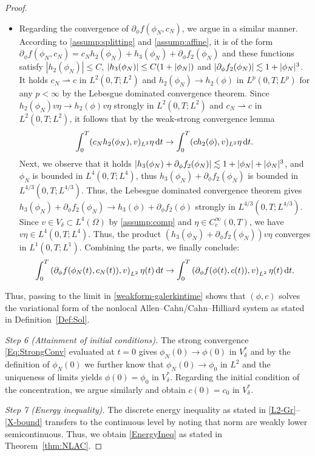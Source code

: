 \documentclass[]{article}
\newcommand{\dt}{\,\textup{d}t}
\DeclarePairedDelimiter{\abs}{\lvert}{\rvert}
\begin{document}
\begin{proof}
\begin{itemize}
		\item Regarding the convergence of $\partial_\phi f(\phi_N,c_N)$, we argue in a similar manner. According to \eqref{assump:splitting} and \eqref{assump:affine}, it is of the form
		$\partial_\phi f(\phi_N, c_N) = c_N h_2(\phi_N) + h_3(\phi_N) + \partial_\phi f_2(\phi_N)$ and these functions satisfy
		$|h_2(\phi_N)| \leq C$, $|h_3(\phi_N)| \leq C(1 + \abs{\phi_N})$ and $|\partial_\phi f_2(\phi_N)| \lesssim 1+ \abs{\phi_N}^3$.
		It holds $c_N \rightharpoonup c$ in $L^2(0,T; L^2)$ and $h_2(\phi_N) \to h_2(\phi)$ in $L^p(0,T; L^p)$ for any $p < \infty$ by the Lebesgue dominated convergence theorem. 
		Since $h_2(\phi_N) v \eta \to h_2(\phi) v\eta $ strongly in $L^2(0,T; L^2)$ and $c_N \rightharpoonup c$ in $L^2(0,T; L^2)$, it follows that by the weak-strong convergence lemma 
		$$\int_0^T (c_N h_2(\phi_N), v)_{L^2} \eta    \dt \to \int_0^T ( c h_2(\phi),v)_{L^2} \eta   \dt.
		$$
		Next, we observe that it holds $|h_3(\phi_N)+\partial_\phi f_2(\phi_N)| \lesssim 1 + \abs{\phi_N} + \abs{\phi_N}^3$, and $\phi_N$ is bounded in $L^4(0,T; L^4)$, thus $h_3(\phi_N)+\partial_\phi f_2(\phi_N)$ is bounded in $L^{4/3}(0,T; L^{4/3})$. Thus, the Lebesgue dominated convergence theorem gives $h_3(\phi_N)+\partial_\phi f_2(\phi_N) \to h_3(\phi)+\partial_\phi f_2(\phi)$ strongly in $L^{4/3}(0,T; L^{4/3})$.
		Since $v \in V_\delta \subset L^4(\Omega)$ by \eqref{assump:comp} and $\eta \in C_c^\infty(0,T)$, we have $v \eta \in L^4(0,T; L^4)$. Thus, the product $(h_3(\phi_N)+\partial_\phi f_2(\phi_N)) v \eta$ converges in $L^1(0,T; L^1)$.
		Combining the parts, we finally conclude: 
		$$\int_0^T \left( \partial_\phi f(\phi_N(t), c_N(t)), v \right)_{L^2} \eta(t)  \dt \to \int_0^T \left( \partial_\phi f(\phi(t), c(t)), v \right)_{L^2} \eta(t)  \dt.$$
	\end{itemize}
	Thus, passing to the limit in \eqref{weakform-galerkintime} shows that $(\phi,c)$ solves the variational form of the nonlocal Allen--Cahn/Cahn--Hilliard system as stated in Definition~\ref{Def:Sol}. \smallskip
	
	\noindent\emph{Step 6 (Attainment of initial conditions).} The strong convergence \eqref{Eq:StrongConv} evaluated at $t=0$ gives $\phi_N(0) \to \phi(0)$ in $V_\delta^*$ and by the definition of $\phi_N(0)$ we further know that $\phi_N(0) \to \phi_0$ in $L^2$ and the uniqueness of limits yields $\phi(0)=\phi_0$ in $V_\delta^*$. Regarding the initial condition of the concentration, we argue similarly and obtain $c(0)=c_0$ in $V_\delta^*$.\smallskip
	
	\noindent\emph{Step 7 (Energy inequality).} The discrete energy inequality as stated in \eqref{L2-Gr}--\eqref{X-bound} transfers to the continuous level by noting that norm are weakly lower semicontinuous. Thus, we obtain \eqref{EnergyIneq} as stated in Theorem~\ref{thm:NLAC}.   \smallskip
	

\end{proof}
\end{document}
